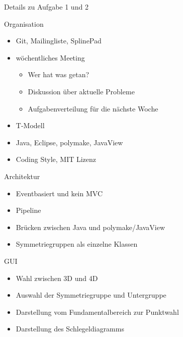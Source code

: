 \documentclass[ucs,11pt]{beamer}
\begin{document}
\begin{frame}{Details zu Aufgabe 1 und 2}
\end{frame}

\begin{frame}{Organisation}
		\begin{itemize}
			\item Git, Mailingliste, SplinePad \pause
			\item wöchentliches Meeting \pause
				\begin{itemize}
					\item Wer hat was getan?
					\item Diskussion über aktuelle Probleme
					\item Aufgabenverteilung für die nächste Woche
				\end{itemize} \pause
			\item T-Modell \pause
			\item Java, Eclipse, polymake, JavaView \pause
			\item Coding Style, MIT Lizenz
		\end{itemize}
\end{frame}

\begin{frame}{Architektur}
	\begin{itemize}
		\item Eventbasiert und kein MVC \pause
		\item Pipeline \pause
		\item Brücken zwischen Java und polymake/JavaView \pause
		\item Symmetriegruppen als einzelne Klassen
	\end{itemize}
\end{frame}

\begin{frame}{GUI}
	\begin{itemize}
		\item Wahl zwischen 3D und 4D \pause
		\item Auswahl der Symmetriegruppe und Untergruppe \pause
		\item Darstellung vom Fundamentalbereich zur Punktwahl \pause
		\item Darstellung des Schlegeldiagramms
	\end{itemize}
\end{frame}
\end{document}
